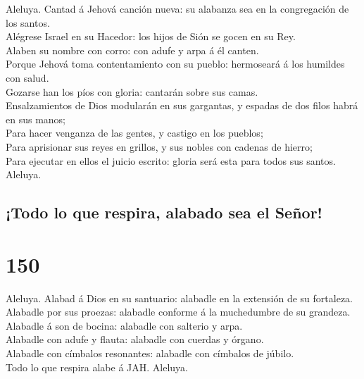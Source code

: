  Aleluya. Cantad á Jehová canción nueva: su alabanza sea en
la congregación de los santos.\\
 Alégrese Israel en su Hacedor: los hijos de Sión se gocen
en su Rey.\\
 Alaben su nombre con corro: con adufe y arpa á él canten.\\
 Porque Jehová toma contentamiento con su pueblo: hermoseará
á los humildes con salud.\\
 Gozarse han los píos con gloria: cantarán sobre sus
camas.\\
 Ensalzamientos de Dios modularán en sus gargantas, y
espadas de dos filos habrá en sus manos;\\
 Para hacer venganza de las gentes, y castigo en los
pueblos;\\
 Para aprisionar sus reyes en grillos, y sus nobles con
cadenas de hierro;\\
 Para ejecutar en ellos el juicio escrito: gloria será esta
para todos sus santos. Aleluya.

\hypertarget{todo-lo-que-respira-alabado-sea-el-seuxf1or}{%
\subsection{¡Todo lo que respira, alabado sea el
Señor!}\label{todo-lo-que-respira-alabado-sea-el-seuxf1or}}

\hypertarget{section-149}{%
\section{150}\label{section-149}}

 Aleluya. Alabad á Dios en su santuario: alabadle en la
extensión de su fortaleza.\\
 Alabadle por sus proezas: alabadle conforme á la
muchedumbre de su grandeza.\\
 Alabadle á son de bocina: alabadle con salterio y arpa.\\
 Alabadle con adufe y flauta: alabadle con cuerdas y
órgano.\\
 Alabadle con címbalos resonantes: alabadle con címbalos de
júbilo.\\
 Todo lo que respira alabe á JAH. Aleluya.
